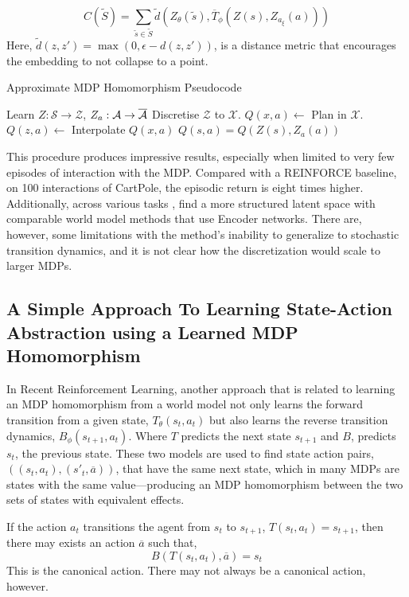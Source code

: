 \begin{equation}
	C(\tilde{S}) = \sum_{\tilde{s} \in \tilde{S}} \tilde{d}(Z_\theta(\tilde{s}), \overline{T}_\phi(Z(s), Z_{a_\xi}(a)))
\end{equation}
Here, $\tilde{d}(z, z') = \max(0, \epsilon - d(z, z'))$, is a distance metric that encourages the embedding to not collapse to a point.
\begin{algorithm}
	\caption{Approximate MDP Homomorphism Pseudocode}
	\begin{algorithmic}
		\State Learn $Z: \mathcal{S} \rightarrow \mathcal{Z}$, $Z_a: \mathcal{A} \rightarrow \overline{\mathcal{A}}$
		\State Discretise $\mathcal{Z}$ to $\mathcal{X}$.
		\State $Q(x, a) \leftarrow $ Plan in $\mathcal{X}$.
		\State $Q(z, a) \leftarrow$ Interpolate $Q(x, a)$
		\State $Q(s, a) = Q(Z(s), Z_a(a))$
	\end{algorithmic}
\end{algorithm}
This procedure produces impressive results, especially when limited to very few episodes of interaction with the MDP. Compared with a REINFORCE baseline, on 100 interactions of CartPole, the episodic return is eight times higher. Additionally, across various tasks \cite{van2020plannable}, find a more structured latent space with comparable world model methods that use Encoder networks. There are, however, some limitations with the method's inability to generalize to stochastic transition dynamics, and it is not clear how the discretization would scale to larger MDPs.

\subsection{A Simple Approach To Learning State-Action Abstraction using a Learned MDP Homomorphism}
In Recent Reinforcement Learning, another approach that is related to learning an MDP homomorphism from a world model \cite{mavor2022simple} not only learns the forward transition from a given state, $T_\theta(s_t, a_t)$ but also learns the reverse transition dynamics, $B_\phi(s_{t+1}, a_t)$. Where $T$ predicts the next state $s_{t+1}$ and $B$, predicts $s_t$, the previous state. These two models are used to find state action pairs, $((s_t, a_t), (s'_t, \overline{a}))$,  that have the same next state, which in many MDPs are states with the same value—producing an MDP homomorphism between the two sets of states with equivalent effects.

If the action $a_t$ transitions the agent from $s_t$ to $s_{t+1}$, $T(s_t, a_t) = s_{t+1}$, then there may exists an action $\overline{a}$ such that,
\begin{equation}
	B(T(s_t, a_t), \overline{a}) = s_t
\end{equation}
This is the canonical action. There may not always be a canonical action, however.

